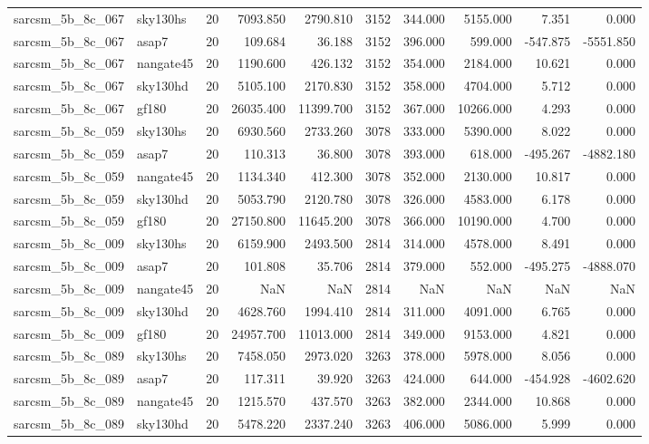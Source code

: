 \begin{tabular}{llrrrrrrrr}
sarcsm\_5b\_8c\_067 & sky130hs & 20 & 7093.850 & 2790.810 & 3152 & 344.000 & 5155.000 & 7.351 & 0.000 \\
sarcsm\_5b\_8c\_067 & asap7 & 20 & 109.684 & 36.188 & 3152 & 396.000 & 599.000 & -547.875 & -5551.850 \\
sarcsm\_5b\_8c\_067 & nangate45 & 20 & 1190.600 & 426.132 & 3152 & 354.000 & 2184.000 & 10.621 & 0.000 \\
sarcsm\_5b\_8c\_067 & sky130hd & 20 & 5105.100 & 2170.830 & 3152 & 358.000 & 4704.000 & 5.712 & 0.000 \\
sarcsm\_5b\_8c\_067 & gf180 & 20 & 26035.400 & 11399.700 & 3152 & 367.000 & 10266.000 & 4.293 & 0.000 \\
sarcsm\_5b\_8c\_059 & sky130hs & 20 & 6930.560 & 2733.260 & 3078 & 333.000 & 5390.000 & 8.022 & 0.000 \\
sarcsm\_5b\_8c\_059 & asap7 & 20 & 110.313 & 36.800 & 3078 & 393.000 & 618.000 & -495.267 & -4882.180 \\
sarcsm\_5b\_8c\_059 & nangate45 & 20 & 1134.340 & 412.300 & 3078 & 352.000 & 2130.000 & 10.817 & 0.000 \\
sarcsm\_5b\_8c\_059 & sky130hd & 20 & 5053.790 & 2120.780 & 3078 & 326.000 & 4583.000 & 6.178 & 0.000 \\
sarcsm\_5b\_8c\_059 & gf180 & 20 & 27150.800 & 11645.200 & 3078 & 366.000 & 10190.000 & 4.700 & 0.000 \\
sarcsm\_5b\_8c\_009 & sky130hs & 20 & 6159.900 & 2493.500 & 2814 & 314.000 & 4578.000 & 8.491 & 0.000 \\
sarcsm\_5b\_8c\_009 & asap7 & 20 & 101.808 & 35.706 & 2814 & 379.000 & 552.000 & -495.275 & -4888.070 \\
sarcsm\_5b\_8c\_009 & nangate45 & 20 & NaN & NaN & 2814 & NaN & NaN & NaN & NaN \\
sarcsm\_5b\_8c\_009 & sky130hd & 20 & 4628.760 & 1994.410 & 2814 & 311.000 & 4091.000 & 6.765 & 0.000 \\
sarcsm\_5b\_8c\_009 & gf180 & 20 & 24957.700 & 11013.000 & 2814 & 349.000 & 9153.000 & 4.821 & 0.000 \\
sarcsm\_5b\_8c\_089 & sky130hs & 20 & 7458.050 & 2973.020 & 3263 & 378.000 & 5978.000 & 8.056 & 0.000 \\
sarcsm\_5b\_8c\_089 & asap7 & 20 & 117.311 & 39.920 & 3263 & 424.000 & 644.000 & -454.928 & -4602.620 \\
sarcsm\_5b\_8c\_089 & nangate45 & 20 & 1215.570 & 437.570 & 3263 & 382.000 & 2344.000 & 10.868 & 0.000 \\
sarcsm\_5b\_8c\_089 & sky130hd & 20 & 5478.220 & 2337.240 & 3263 & 406.000 & 5086.000 & 5.999 & 0.000 \\

\end{tabular}
